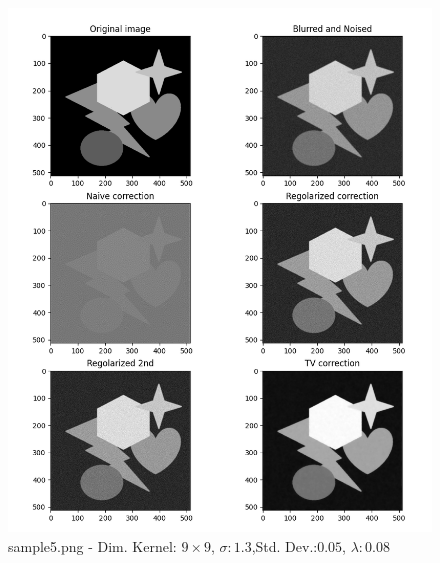 \documentclass[12pt]{article}
\begin{document}
    \newpage
    \begin{figure}[h!]
    \includegraphics[width=14cm]{sample5}
    \caption{sample5.png - Dim. Kernel: $9\times9$, $\sigma:1.3$,Std. Dev.:$0.05$, $\lambda:0.08$}
    \end{figure}
    \newpage
\end{document}
